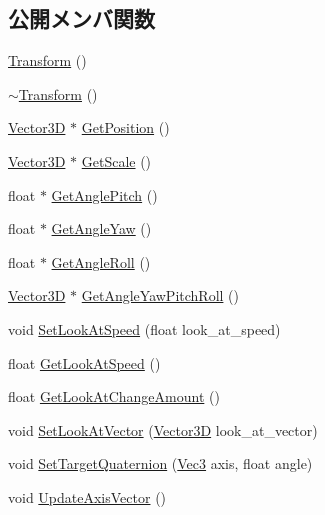 \subsection*{公開メンバ関数}
\begin{DoxyCompactItemize}
\item 
\mbox{\hyperlink{class_transform_aa08ca4266efabc768973cdeea51945ab}{Transform}} ()
\item 
\mbox{\hyperlink{class_transform_aa72e286c069850db80927b0e6554cd3e}{$\sim$\+Transform}} ()
\item 
\mbox{\hyperlink{class_vector3_d}{Vector3D}} $\ast$ \mbox{\hyperlink{class_transform_addff6461a77b9f5c5249e46deb5c2c19}{Get\+Position}} ()
\item 
\mbox{\hyperlink{class_vector3_d}{Vector3D}} $\ast$ \mbox{\hyperlink{class_transform_accedf33a4ddbdcf2d4fc4274f85bf818}{Get\+Scale}} ()
\item 
float $\ast$ \mbox{\hyperlink{class_transform_a8c4966ea0a5d6cafa79c430e31bf0dff}{Get\+Angle\+Pitch}} ()
\item 
float $\ast$ \mbox{\hyperlink{class_transform_a8be9cd3526cc18d64e47b55f4c527dd8}{Get\+Angle\+Yaw}} ()
\item 
float $\ast$ \mbox{\hyperlink{class_transform_a124d6afb5dd0a86952c99f1cec72e394}{Get\+Angle\+Roll}} ()
\item 
\mbox{\hyperlink{class_vector3_d}{Vector3D}} $\ast$ \mbox{\hyperlink{class_transform_a1bd5cddc216e7fafe12e5b605cb780ea}{Get\+Angle\+Yaw\+Pitch\+Roll}} ()
\item 
void \mbox{\hyperlink{class_transform_ab6f7342cb4eca555c02a85c999d499dc}{Set\+Look\+At\+Speed}} (float look\+\_\+at\+\_\+speed)
\item 
float \mbox{\hyperlink{class_transform_a79fdb2cb4eb1e4abf48e0f9fd74707ba}{Get\+Look\+At\+Speed}} ()
\item 
float \mbox{\hyperlink{class_transform_a14b7b06632d6a47e99dc67aecbd7acc7}{Get\+Look\+At\+Change\+Amount}} ()
\item 
void \mbox{\hyperlink{class_transform_a39b78acbdbf3ee98cad0c4e640988745}{Set\+Look\+At\+Vector}} (\mbox{\hyperlink{class_vector3_d}{Vector3D}} look\+\_\+at\+\_\+vector)
\item 
void \mbox{\hyperlink{class_transform_ac8cdb5ca9995d9c124f1890d84c92ab4}{Set\+Target\+Quaternion}} (\mbox{\hyperlink{_vector3_d_8h_ab16f59e4393f29a01ec8b9bbbabbe65d}{Vec3}} axis, float angle)
\item 
void \mbox{\hyperlink{class_transform_afe5350bb1558256115e14c0669611acd}{Update\+Axis\+Vector}} ()

\end{DoxyCompactItemize}
